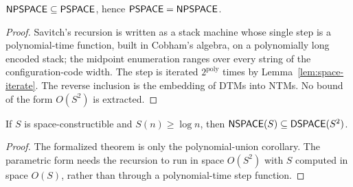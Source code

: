 \begin{theorem}[Savitch]
  \label{thm:space-savitch}
  \leanok
  $\mathsf{NPSPACE} \subseteq \mathsf{PSPACE}$, hence $\mathsf{PSPACE} = \mathsf{NPSPACE}$.
\end{theorem}
\begin{proof}
  \leanok
  Savitch's recursion is written as a stack machine whose single step is a
  polynomial-time function, built in Cobham's algebra, on a polynomially long
  encoded stack; the midpoint enumeration ranges over every string of the
  configuration-code width. The step is iterated $2^{\mathrm{poly}}$ times by
  Lemma~\ref{lem:space-iterate}. The reverse inclusion is the embedding of
  DTMs into NTMs. No bound of the form $O(S^2)$ is extracted.
\end{proof}

\begin{theorem}
  \label{thm:space-savitch-general}
  \notready
  If $S$ is space-constructible and $S(n) \ge \log n$, then
  $\mathsf{NSPACE}(S) \subseteq \mathsf{DSPACE}(S^2)$.
\end{theorem}
\begin{proof}
  The formalized theorem is only the polynomial-union corollary. The
  parametric form needs the recursion to run in space $O(S^2)$ with $S$
  computed in space $O(S)$, rather than through a polynomial-time step
  function.
\end{proof}

